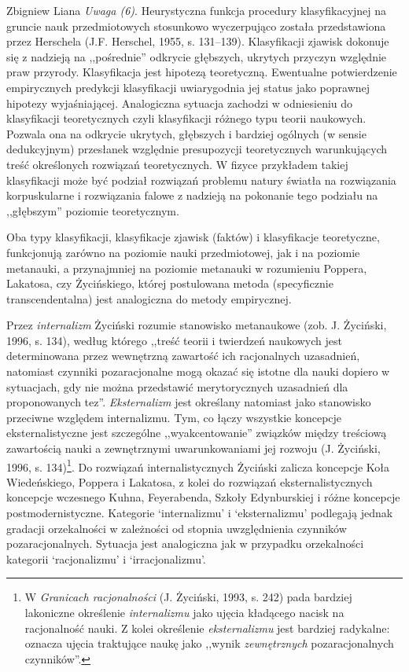 \begin{artplenv}{Zbigniew Liana}
\textit{Uwaga (6)}. Heurystyczna funkcja procedury klasyfikacyjnej na gruncie nauk przedmiotowych stosunkowo wyczerpująco
została przedstawiona przez Herschela \label{ref:RND1u8fbCVzxR}(J.F. Herschel, 1955, s. 131–139). Klasyfikacji zjawisk
dokonuje się z nadzieją na ,,pośrednie'' odkrycie głębszych, ukrytych przyczyn względnie praw przyrody. Klasyfikacja jest
hipotezą teoretyczną. Ewentualne potwierdzenie empirycznych predykcji klasyfikacji uwiarygodnia jej status jako
poprawnej hipotezy wyjaśniającej. Analogiczna sytuacja zachodzi w odniesieniu do klasyfikacji teoretycznych czyli
klasyfikacji różnego typu teorii naukowych. Pozwala ona na odkrycie ukrytych, głębszych i bardziej ogólnych (w sensie
dedukcyjnym) przesłanek względnie presupozycji teoretycznych warunkujących treść określonych rozwiązań
teoretycznych. W fizyce przykładem takiej klasyfikacji może być podział rozwiązań problemu natury światła na rozwiązania
korpuskularne i rozwiązania falowe z nadzieją na pokonanie tego podziału na ,,głębszym'' poziomie teoretycznym.

Oba typy klasyfikacji, klasyfikacje zjawisk (faktów) i klasyfikacje teoretyczne, funkcjonują zarówno na poziomie nauki
przedmiotowej, jak i na poziomie metanauki, a przynajmniej na poziomie metanauki w rozumieniu Poppera, Lakatosa, czy
Życińskiego, której postulowana metoda (specyficznie transcendentalna) jest analogiczna do metody empirycznej.

Przez \textit{internalizm} Życiński rozumie stanowisko metanaukowe \label{ref:RNDCyQqUrHYuu}(zob. J. Życiński, 1996,
s. 134), według którego ,,treść teorii i twierdzeń naukowych jest determinowana przez wewnętrzną zawartość ich racjonalnych
uzasadnień, natomiast czynniki pozaracjonalne mogą okazać się istotne dla nauki dopiero w sytuacjach, gdy nie można
przedstawić merytorycznych uzasadnień dla proponowanych tez''.  \textit{Eksternalizm} jest określany natomiast jako
stanowisko przeciwne względem internalizmu. Tym, co łączy wszystkie koncepcje eksternalistyczne jest szczególne
,,wyakcentowanie'' związków między treściową zawartością nauki a zewnętrznymi uwarunkowaniami jej rozwoju
\label{ref:RNDuAc97ED1Y1}(J. Życiński, 1996, s. 134)\footnote{W \textit{Granicach racjonalności}
\label{ref:RND1EgQJ3J1nD}(J. Życiński, 1993, s. 242) pada bardziej lakoniczne określenie \textit{internalizmu} jako
ujęcia kładącego nacisk na racjonalność nauki. Z kolei określenie \textit{eksternalizmu} jest bardziej radykalne: oznacza
ujęcia traktujące naukę jako ,,wynik \textit{zewnętrznych} pozaracjonalnych czynników''.}. Do rozwiązań internalistycznych
Życiński zalicza koncepcje Koła Wiedeńskiego, Poppera i Lakatosa, z kolei do rozwiązań eksternalistycznych koncepcje
wczesnego Kuhna, Feyerabenda, Szkoły Edynburskiej i różne koncepcje postmodernistyczne. Kategorie
`internalizmu' i `eksternalizmu' podlegają jednak gradacji orzekalności w zależności od stopnia uwzględnienia czynników
pozaracjonalnych. Sytuacja jest analogiczna jak w przypadku orzekalności kategorii `racjonalizmu' i `irracjonalizmu'.


\end{artplenv}
